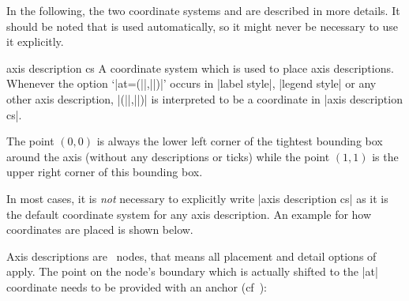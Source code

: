 In the following, the two coordinate systems  and  are described in more details. It should be noted that  is used automatically, so it might never be necessary to use it explicitly.


\begin{coordinatesystem}{axis description cs}
	A coordinate system which is used to place axis descriptions. Whenever the option `|at={(||,||)}|' occurs in |label style|, |legend style| or any other axis description, |(||,||)| is interpreted to be a coordinate in |axis description cs|.

	The point $(0,0)$ is always the lower left corner of the tightest bounding box around the axis (without any descriptions or ticks) while the point $(1,1)$ is the upper right corner of this bounding box.

	In most cases, it is \emph{not} necessary to explicitly write |axis description cs| as it is the default coordinate system for any axis description. An example for how coordinates are placed is shown below.
	
\begin{codeexample}[width=4cm]
\end{codeexample}

Axis descriptions are \Tikz\ nodes, that means all placement and detail options of \cite{tikz} apply. The point on the node's boundary which is actually shifted to the |at| coordinate needs to be provided with an anchor (cf~\cite[Nodes and Edges]{tikz}):
\begin{codeexample}[]
\end{codeexample}
	

\end{coordinatesystem}
